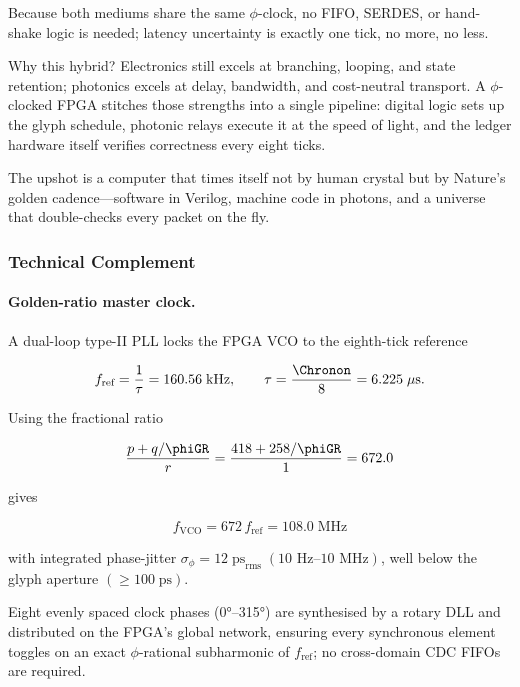 \documentclass[11pt,oneside]{book}
\begin{document}
Because both mediums share the same $\phi$-clock, no FIFO, SERDES, or
hand-shake logic is needed; latency uncertainty is exactly one tick,
no more, no less.

Why this hybrid?  Electronics still excels at branching, looping, and
state retention; photonics excels at delay, bandwidth, and
cost-neutral transport.  A $\phi$-clocked FPGA stitches those strengths
into a single pipeline: digital logic sets up the glyph schedule,
photonic relays execute it at the speed of light, and the ledger
hardware itself verifies correctness every eight ticks.

The upshot is a computer that times itself not by human crystal but by
Nature’s golden cadence—software in Verilog, machine code in photons,
and a universe that double-checks every packet on the fly.



\subsubsection*{Technical Complement}

\paragraph{Golden-ratio master clock.}

A dual-loop type-II PLL locks the FPGA VCO to the eighth-tick
reference  

\[
f_{\text{ref}}=\frac1{\tau}=160.56\;\text{kHz},\qquad
\tau=\frac{\Chronon}{8}=6.225\;\mu\text{s}.
\]

Using the fractional ratio  

\[
\frac{p+q/\phiGR}{r}=\frac{418+258/\phiGR}{1}=672.0
\]

gives  

\[
f_{\text{VCO}} =672\,f_{\text{ref}} =108.0\;\text{MHz}
\]

with integrated phase-jitter  
\(\sigma_{\phi}=12\;\text{ps}_{\text{rms}}\;(10\text{ Hz–10 MHz})\),  
well below the glyph aperture  
\((\!\ge\!100\;\text{ps})\).

Eight evenly spaced clock phases (0°–315°) are
synthesised by a rotary DLL and distributed on the FPGA’s global
network, ensuring every synchronous element toggles on an exact
\(\phi\)-rational subharmonic of \(f_{\text{ref}}\); no
cross-domain CDC FIFOs are required.
\end{document}

